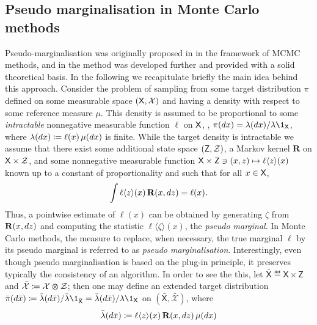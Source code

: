 \subsection{Pseudo marginalisation in Monte Carlo methods}
\label{sec:pseudo:marginalisation}

Pseudo-marginalisation was originally proposed in \cite{beaumont:2003} in the framework of MCMC methods, and in \cite{andrieu:robert:2009} the method was developed further and provided with a solid theoretical basis. In the following we recapitulate briefly the main idea behind this approach. Consider the problem of sampling from some target distribution $\pi$ defined on some measurable space $(\mathsf{X}, \mathcal{X})$ and having a density with respect to some reference measure $\mu$. This density is assumed to be proportional to some \emph{intractable} nonnegative measurable function $\ell$ on $\mathsf{X}$, \ie, $\pi(\rmd x) = \lambda(\rmd x) / \lambda \1_\Xset$, where $\lambda(d x) \coloneqq \ell(x) \, \mu(d x)$ is finite. While the target density is intractable we assume that there exist some additional state space $(\mathsf{Z}, \mathcal{Z})$, a Markov kernel $\mathbf{R}$ on $\mathsf{X} \times \mathcal{Z}$, and some nonnegative measurable function $\mathsf{X} \times \mathsf{Z} \ni (x, z) \mapsto \ell \langle z \rangle (x)$ known up to a constant of proportionality and such that for all $x \in \mathsf{X}$, 
\begin{equation} \label{eq:pseudo:marginalisation}
\int \ell \langle z \rangle(x) \, \mathbf{R}(x, \rmd z) = \ell(x). 
\end{equation}
Thus, a pointwise estimate of $\ell(x)$ can be obtained by generating $\zeta$ from $\mathbf{R}(x, d z)$ and computing the statistic $\ell \langle \zeta \rangle(x)$, the \emph{pseudo marginal}. In Monte Carlo methods, the measure to replace, when necessary, the true marginal $\ell$ by its pseudo marginal is referred to as \emph{pseudo marginalisation}. Interestingly, even though pseudo marginalisation is based on the plug-in principle, it preserves typically the consistency of an algorithm. In order to see the this, let $\bar{\mathsf{X}} \eqdef \mathsf{X} \times \mathsf{Z}$ and $\bar{\mathcal{X}} \coloneqq \mathcal{X} \varotimes \mathcal{Z}$; then one may define an extended target distribution $\bar{\pi}(\rmd \bar{x}) \eqdef \bar{\lambda}(\rmd \bar{x}) / \bar{\lambda} \1_{\bar{\mathsf{X}}} = \bar{\lambda}(\rmd \bar{x}) / \lambda \1_{\mathsf{X}}$ on $(\bar{\mathsf{X}}, \bar{\mathcal{X}})$, where 
\begin{equation} \label{eq:extended:target}
\bar{\lambda}(\rmd \bar{x}) \eqdef \ell \langle z \rangle(x) \, \kernel{R}(x, \rmd z) \, \mu(\rmd x)
\end{equation}
